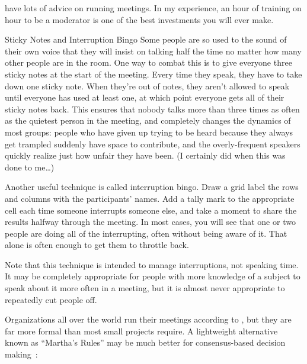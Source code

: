 \cite{Brow2007,Broo2016,Roge2018} have lots of advice on running meetings.
In my experience,
an hour of training on hour to be a moderator
is one of the best investments you will ever make.

\begin{aside}{Sticky Notes and Interruption Bingo}
  Some people are so used to the sound of their own voice
  that they will insist on talking half the time
  no matter how many other people are in the room.
  One way to combat this is to give everyone three sticky notes
  at the start of the meeting.
  Every time they speak,
  they have to take down one sticky note.
  When they're out of notes,
  they aren't allowed to speak until everyone has used at least one,
  at which point everyone gets all of their sticky notes back.
  This ensures that nobody talks more than three times as often as
  the quietest person in the meeting,
  and completely changes the dynamics of most groups:
  people who have given up trying to be heard because they always get trampled
  suddenly have space to contribute,
  and the overly-frequent speakers quickly realize just how unfair they have been.
  (I certainly did when this was done to me{\ldots})

  Another useful technique is called interruption bingo.
  Draw a grid label the rows and columns with the participants' names.
  Add a tally mark to the appropriate cell
  each time someone interrupts someone else,
  and take a moment to share the results halfway through the meeting.
  In most cases,
  you will see that one or two people are doing all of the interrupting,
  often without being aware of it.
  That alone is often enough to get them to throttle back.

  Note that this technique is intended to manage interruptions,
  not speaking time.
  It may be completely appropriate for people with more knowledge of a subject
  to speak about it more often in a meeting,
  but it is almost never appropriate to repeatedly cut people off.
\end{aside}


Organizations all over the world run their meetings according to
,
but they are far more formal than most small projects require.
A lightweight alternative known as ``Martha's Rules''
may be much better for consensus-based decision making~\cite{Mina1986}:

